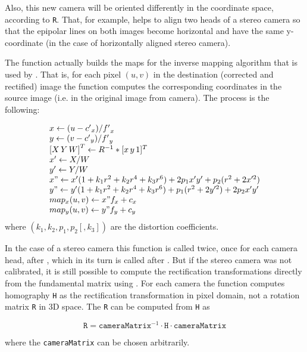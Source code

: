 Also, this new camera will be oriented differently in the coordinate space, according to \texttt{R}. That, for example, helps to align two heads of a stereo camera so that the epipolar lines on both images become horizontal and have the same y- coordinate (in the case of horizontally aligned stereo camera).

The function actually builds the maps for the inverse mapping algorithm that is used by . That is, for each pixel $(u, v)$ in the destination (corrected and rectified) image the function computes the corresponding coordinates in the source image (i.e. in the original image from camera). The process is the following:

\[
\begin{array}{l}
x \leftarrow (u - {c'}_x)/{f'}_x \\
y \leftarrow (v - {c'}_y)/{f'}_y \\
{[X\,Y\,W]}^T \leftarrow R^{-1}*[x\,y\,1]^T \\
x' \leftarrow X/W \\
y' \leftarrow Y/W \\
x" \leftarrow x' (1 + k_1 r^2 + k_2 r^4 + k_3 r^6) + 2p_1 x' y' + p_2(r^2 + 2 x'^2) \\
y" \leftarrow y' (1 + k_1 r^2 + k_2 r^4 + k_3 r^6) + p_1 (r^2 + 2 y'^2) + 2 p_2 x' y' \\
map_x(u,v) \leftarrow x" f_x + c_x \\
map_y(u,v) \leftarrow y" f_y + c_y
\end{array}
\]
where $(k_1, k_2, p_1, p_2[, k_3])$ are the distortion coefficients.

In the case of a stereo camera this function is called twice, once for each camera head, after , which in its turn is called after . But if the stereo camera was not calibrated, it is still possible to compute the rectification transformations directly from the fundamental matrix using . For each camera the function computes homography \texttt{H} as the rectification transformation in pixel domain, not a rotation matrix \texttt{R} in 3D space. The \texttt{R} can be computed from \texttt{H} as

\[ \texttt{R} = \texttt{cameraMatrix}^{-1} \cdot \texttt{H} \cdot \texttt{cameraMatrix} \]

where the \texttt{cameraMatrix} can be chosen arbitrarily.

\ifCpp

